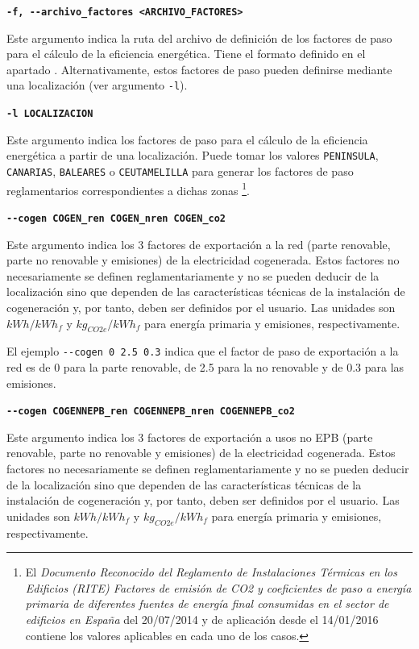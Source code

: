 \documentclass[10pt,notitlepage,oneside,a4paper]{article}
\begin{document}
\textbf{\texttt{-f, -{}-archivo\_factores <ARCHIVO\_FACTORES>}}

Este argumento indica la ruta del archivo de definición de los factores de paso para el cálculo de la eficiencia energética. Tiene el formato definido en el apartado .
Alternativamente, estos factores de paso pueden definirse mediante una localización (ver argumento \texttt{-l}).

\textbf{\texttt{-l LOCALIZACION}}

Este argumento indica los factores de paso para el cálculo de la eficiencia energética a partir de una localización. Puede tomar los valores \texttt{PENINSULA}, \texttt{CANARIAS}, \texttt{BALEARES} o \texttt{CEUTAMELILLA} para generar los factores de paso reglamentarios correspondientes a dichas zonas \footnote{El \textit{Documento Reconocido del Reglamento de Instalaciones Térmicas en los Edificios (RITE) Factores de emisión de CO2 y coeficientes de paso a energía primaria de diferentes fuentes de energía final consumidas en el sector de edificios en España} del 20/07/2014 y de aplicación desde el 14/01/2016 contiene los valores aplicables en cada uno de los casos.}.

%

\textbf{\texttt{-{}-cogen COGEN\_ren COGEN\_nren COGEN\_co2}}

Este argumento indica los 3 factores de exportación a la red (parte renovable, parte no renovable y emisiones) de la electricidad cogenerada. Estos factores no necesariamente se definen reglamentariamente y no se pueden deducir de la localización sino que dependen de las características técnicas de la instalación de cogeneración y, por tanto, deben ser definidos por el usuario. Las unidades son $kWh/kWh_f$ y $kg_{CO2e}/kWh_f$ para energía primaria y emisiones, respectivamente.

El ejemplo \texttt{-{}-cogen 0 2.5 0.3} indica que el factor de paso de exportación a la red es de 0 para la parte renovable, de 2.5 para la no renovable y de 0.3 para las emisiones.

\textbf{\texttt{-{}-cogen COGENNEPB\_ren COGENNEPB\_nren COGENNEPB\_co2}}

Este argumento indica los 3 factores de exportación a usos no EPB (parte renovable, parte no renovable y emisiones) de la electricidad cogenerada. Estos factores no necesariamente se definen reglamentariamente y no se pueden deducir de la localización sino que dependen de las características técnicas de la instalación de cogeneración y, por tanto, deben ser definidos por el usuario. Las unidades son $kWh/kWh_f$ y $kg_{CO2e}/kWh_f$ para energía primaria y emisiones, respectivamente.
\end{document}
